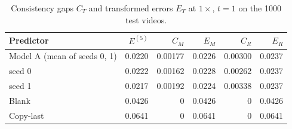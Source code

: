 \begin{table}[H]\centering\small
\caption{Consistency gaps $C_T$ and transformed errors $E_T$ at $1\times$, $t=1$ on the 1000 test videos.}\label{tab:t3}
\begin{tabular}{lrrrrr}\toprule
Predictor & $E^{(5)}$ & $C_M$ & $E_M$ & $C_R$ & $E_R$ \\ \midrule
Model A (mean of seeds 0, 1) & 0.0220 & 0.00177 & 0.0226 & 0.00300 & 0.0237 \\
\quad seed 0 & 0.0222 & 0.00162 & 0.0228 & 0.00262 & 0.0237 \\
\quad seed 1 & 0.0217 & 0.00192 & 0.0224 & 0.00338 & 0.0237 \\
Blank & 0.0426 & 0 & 0.0426 & 0 & 0.0426 \\
Copy-last & 0.0641 & 0 & 0.0641 & 0 & 0.0641 \\
\bottomrule\end{tabular}
\end{table}